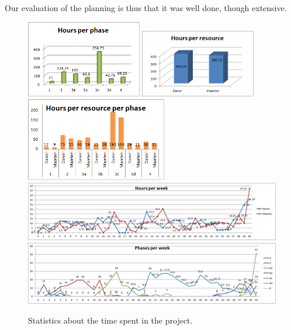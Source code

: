 Our evaluation of the planning is thus that it was well done, though extensive.
%
\begin{figure}[htb!]
	\centering
	\includegraphics[width=0.45\textwidth]{Figures/HoursPerPhase}
	\includegraphics[width=0.45\textwidth]{Figures/HoursPerResource}
	\includegraphics[width=0.55\textwidth]{Figures/HoursPerResourcePerPhase}
	\includegraphics[width=1.00\textwidth]{Figures/HoursPerWeek}
	\includegraphics[width=1.00\textwidth]{Figures/HoursPerPhasePerWeek}
	\caption{Statistics about the time spent in the project.
     }
	\label{fig:hour-statistics}
\end{figure}
